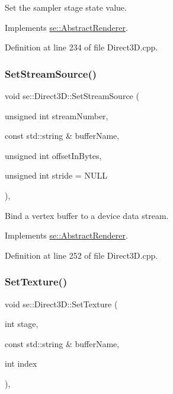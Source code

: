 Set the sampler stage state value. 

Implements \mbox{\hyperlink{classse_1_1_abstract_renderer_a1abafecf778ef68a08ba44b88ded6abe}{se\+::\+Abstract\+Renderer}}.



Definition at line 234 of file Direct3\+D.\+cpp.

\mbox{\label{classse_1_1_direct3_d_a0be0c6f8f0c90478def2ade3459226ba}} 
\subsubsection{\texorpdfstring{Set\+Stream\+Source()}{SetStreamSource()}}
{\footnotesize\ttfamily void se\+::\+Direct3\+D\+::\+Set\+Stream\+Source (\begin{DoxyParamCaption}\item[{unsigned int}]{stream\+Number,  }\item[{const std\+::string \&}]{buffer\+Name,  }\item[{unsigned int}]{offset\+In\+Bytes,  }\item[{unsigned int}]{stride = {\ttfamily NULL} }\end{DoxyParamCaption})\hspace{0.3cm}{\ttfamily [override]}, {\ttfamily [virtual]}}

Bind a vertex buffer to a device data stream. 

Implements \mbox{\hyperlink{classse_1_1_abstract_renderer_a62027b239c98c7a5b3a347e737d83fbe}{se\+::\+Abstract\+Renderer}}.



Definition at line 252 of file Direct3\+D.\+cpp.

\mbox{\label{classse_1_1_direct3_d_a5e78e332321a2a66ba184b4441e3ec31}} 
\subsubsection{\texorpdfstring{Set\+Texture()}{SetTexture()}}
{\footnotesize\ttfamily void se\+::\+Direct3\+D\+::\+Set\+Texture (\begin{DoxyParamCaption}\item[{int}]{stage,  }\item[{const std\+::string \&}]{buffer\+Name,  }\item[{int}]{index }\end{DoxyParamCaption})\hspace{0.3cm}{\ttfamily [override]}, {\ttfamily [virtual]}}

